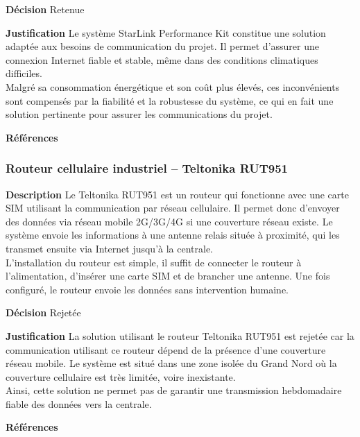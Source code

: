 \noindent\textbf{Décision} Retenue
\smallskip

\noindent\textbf{Justification} Le système StarLink Performance Kit constitue une solution adaptée aux besoins de communication du projet. Il permet d'assurer une connexion Internet fiable et stable, même dans des conditions climatiques difficiles. \\

Malgré sa consommation énergétique et son coût plus élevés, ces inconvénients sont compensés par la fiabilité et la robustesse du système, ce qui en fait une solution pertinente pour assurer les communications du projet.
\smallskip

\noindent\textbf{Références} 
\cite{Starlink1}
\cite{Starlink2}
\cite{Starlink3}

\subsubsection{Routeur cellulaire industriel – Teltonika RUT951}
\label{sec:route}
\noindent\textbf{Description} Le Teltonika RUT951 est un routeur qui fonctionne avec une carte SIM utilisant la communication par réseau cellulaire. Il permet donc d’envoyer des données via réseau mobile 2G/3G/4G si une couverture réseau existe. Le système envoie les informations à une antenne relais située à proximité, qui les transmet ensuite via Internet jusqu’à la centrale. \\

L’installation du routeur est simple, il suffit de connecter le routeur à l’alimentation, d’insérer une carte SIM et de brancher une antenne. Une fois configuré, le routeur envoie les données sans intervention humaine.
\smallskip

\noindent\textbf{Décision} Rejetée
\smallskip

\noindent\textbf{Justification} La solution utilisant le routeur Teltonika RUT951 est rejetée car la communication utilisant ce routeur dépend de la présence d’une couverture réseau mobile. Le système est situé dans une zone isolée du Grand Nord où la couverture cellulaire est très limitée, voire inexistante. \\

Ainsi, cette solution ne permet pas de garantir une transmission hebdomadaire fiable des données vers la centrale.
\smallskip

\noindent\textbf{Références} 
\cite{Cellulaire1}
\cite{Cellulaire2}

